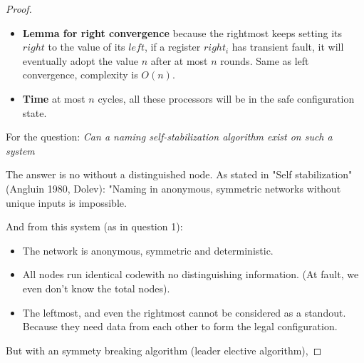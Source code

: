 \documentclass[12pt]{article}
\begin{document}
\begin{proof}
\begin{itemize}
    \item \textbf{Lemma for right convergence} because the rightmost keeps setting its $right$ to the value of its $left$,
    if a register $right_i$ has transient fault, it will eventually adopt the value $n$ after at most $n$ rounds. Same as
    left convergence, complexity is $O(n)$.

    \item \textbf{Time} at most $n$ cycles, all these processors will be in the safe configuration state.
\end{itemize}

For the question: \textit{Can a naming self-stabilization algorithm exist on such a system}

The answer is no without a distinguished node. As stated in "Self stabilization" (Angluin 1980, Dolev): "Naming in anonymous,
symmetric networks without unique inputs is impossible.

And from this system (as in question 1):
\begin{itemize}
    \item The network is anonymous, symmetric and deterministic.
    \item All nodes run identical codewith no distinguishing information. (At fault, we even don't know the total nodes).
    \item The leftmost, and even the rightmost cannot be considered as a standout. Because they need data from each other 
    to form the legal configuration. 
\end{itemize}

But with an symmety breaking algorithm (leader elective algorithm), 

\end{proof}

\vspace{3in}
\end{document}
